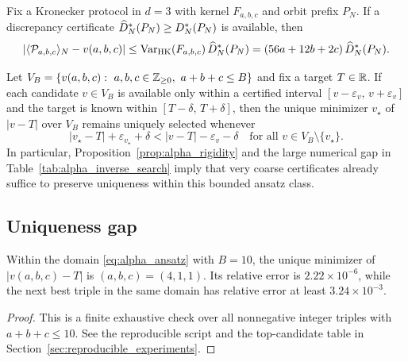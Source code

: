 \begin{corollary}
\label{cor:abc_sampling_certificate}
Fix a Kronecker protocol in $d=3$ with kernel $F_{a,b,c}$ and orbit prefix $P_N$.
If a discrepancy certificate $\widehat D_N^\ast(P_N)\ge D_N^\ast(P_N)$ is available, then
\[
\left|\langle \mathcal{P}_{a,b,c} \rangle_N-v(a,b,c)\right|
\le \mathrm{Var}_{\mathrm{HK}}(F_{a,b,c})\,\widehat D_N^\ast(P_N)
=(56a+12b+2c)\,\widehat D_N^\ast(P_N).
\]
\end{corollary}

\begin{remark}
Let $V_B=\{v(a,b,c):\ a,b,c\in\ZZ_{\ge 0},\ a+b+c\le B\}$ and fix a target $T\in\mathbb{R}$.
If each candidate $v\in V_B$ is available only within a certified interval $[v-\varepsilon_v,\,v+\varepsilon_v]$ and the target is known within $[T-\delta,\,T+\delta]$, then the unique minimizer $v_\star$ of $|v-T|$ over $V_B$ remains uniquely selected whenever
\[
|v_\star-T|+\varepsilon_{v_\star}+\delta
<
|v-T|-\varepsilon_v-\delta
\quad\text{for all }v\in V_B\setminus\{v_\star\}.
\]
In particular, Proposition~\ref{prop:alpha_rigidity} and the large numerical gap in Table~\ref{tab:alpha_inverse_search} imply that very coarse certificates already suffice to preserve uniqueness within this bounded ansatz class.
\end{remark}

\subsection{Uniqueness gap}
\label{sec:uniqueness_gap}

\begin{proposition}
\label{prop:alpha_rigidity}
Within the domain \eqref{eq:alpha_ansatz} with $B=10$, the unique minimizer of
$|v(a,b,c)-T|$ is $(a,b,c)=(4,1,1)$.
Its relative error is $2.22\times 10^{-6}$, while the next best triple in the same domain has relative error at least $3.24\times 10^{-3}$.
\end{proposition}

\begin{proof}
This is a finite exhaustive check over all nonnegative integer triples with $a+b+c\le 10$.
See the reproducible script  and the top-candidate table in Section~\ref{sec:reproducible_experiments}.
\end{proof}

